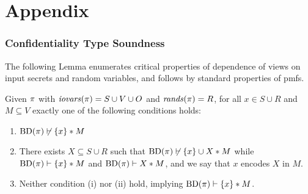 \section*{Appendix}

\subsubsection{Confidentiality Type Soundness}


The following Lemma enumerates critical properties of dependence of
views on input secrets and random variables, and follows by standard
properties of pmfs.
\begin{lemma}
  \label{lemma-interference}
  Given $\pi$ with $\mathit{iovars}(\pi) = S \cup V \cup O$ and $\mathit{rands}(\pi) = R$,
  for all $x \in S \cup R$ and $M \subseteq V$ exactly one of the following conditions holds:
  \begin{enumerate}[\hspace{5mm}i.]
  \item $\mathrm{BD}(\pi) \not\vdash \{ x \} * M$
  \item There exists $X \subseteq S \cup R$ such that
    $\mathrm{BD}(\pi) \not\vdash \{ x \} \cup X * M$ while
    $\mathrm{BD}(\pi) \vdash \{ x \} * M$ and $\mathrm{BD}(\pi) \vdash X * M$,
    and we say that $x$ encodes $X$ in $M$.
  \item Neither condition (i) nor (ii) hold, implying $\mathrm{BD}(\pi) \vdash \{ x \} * M$.
  \end{enumerate}
\end{lemma}


